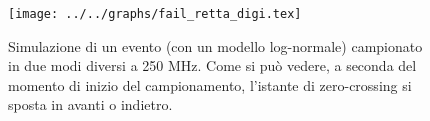 \begin{figure}[h] \centering\texttt{[image: ../../graphs/fail\_retta\_digi.tex]}\caption{Simulazione di un evento (con un modello log-normale) campionato in due modi diversi a 250 MHz. Come si può vedere, a seconda del momento di inizio del campionamento, l'istante di zero-crossing si sposta in avanti o indietro.}\label{gr:fail_retta_digi} \end{figure}

